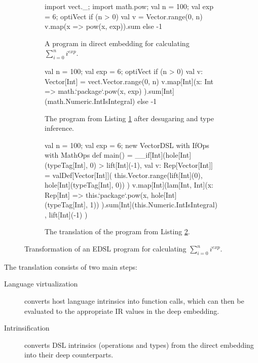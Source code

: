 \documentclass[paper.tex]{subfiles}
\begin{document}
\begin{figure*}
\begin{multicols}{2}
\begin{subfigure}[b]{1\linewidth}
\centering
\vspace{+12.40pt}
\begin{listingtiny}
import vect._; import math.pow;
val n = 100; val exp = 6;
optiVect {
  if (n > 0) {
    val v = Vector.range(0, n)
    v.map(x => pow(x, exp)).sum
  } else -1
}
\end{listingtiny}
\vspace{+12.40pt}
\caption{A program in direct embedding for calculating $\sum_{i=0}^n i^{exp}$.}
\label{lst:shallow}
\end{subfigure}

\begin{subfigure}[b]{1\linewidth}
\centering
\begin{listingtiny}
val n = 100; val exp = 6;
optiVect {
  if (n > 0) {
    val v: Vector[Int] =
      vect.Vector.range(0, n)
    v.map[Int](x: Int =>
      math.`package`.pow(x, exp)
    ).sum[Int](math.Numeric.IntIsIntegral)
  } else -1
}
\end{listingtiny}
\caption{The program from Listing \ref{lst:shallow} after desugaring and type inference.}
\label{lst:desugaring}
\end{subfigure}
\end{multicols}

\begin{subfigure}[b]{1\linewidth}
\begin{listingtiny}
val n = 100; val exp = 6;
new VectorDSL with IfOps with MathOps { def main() = {
  __if[Int](hole[Int](typeTag[Int], 0) > lift[Int](-1),{
     val v: Rep[Vector[Int]] = valDef[Vector[Int]](
       this.Vector.range(lift[Int](0), hole[Int](typeTag[Int], 0)) })
     v.map[Int](lam[Int, Int](x: Rep[Int] =>
       this.`package`.pow(x, hole[Int](typeTag[Int], 1))
     ).sum[Int](this.Numeric.IntIsIntegral)
  },{
    lift[Int](-1)
  }
)}

\end{listingtiny}
\caption{The \tool translation of the program from Listing \ref{lst:desugaring}.}
\label{lst:transformed_program}
\end{subfigure}
\caption{\label{fig:translation-example} Transformation of an EDSL program for calculating $\sum_{i=0}^n i^{exp}$.}
\end{figure*}


The translation consists of two main steps:
\begin{description}
\item[Language virtualization] converts host language intrinsics into
  function calls, which can then be evaluated to the appropriate IR
  values in the deep embedding.
\item[\edsl{} Intrinsification] converts DSL intrinsics (operations
  and types) from the direct embedding into their deep counterparts.
\end{description}
\end{document}
